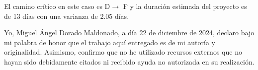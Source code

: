 \documentclass{llncs}
\begin{document}
	El camino crítico en este caso es D$\longrightarrow$ F y la duración estimada del proyecto es de 13 días con una varianza de 2.05 días.

\newpage
Yo, Miguel Ángel Dorado Maldonado, a día 22 de diciembre de 2024, declaro bajo mi palabra de honor que el trabajo aquí entregado es de mi autoría y originalidad. Asimismo, confirmo que no he utilizado recursos externos que no hayan sido debidamente citados ni recibido ayuda no autorizada en su realización.
\end{document}
